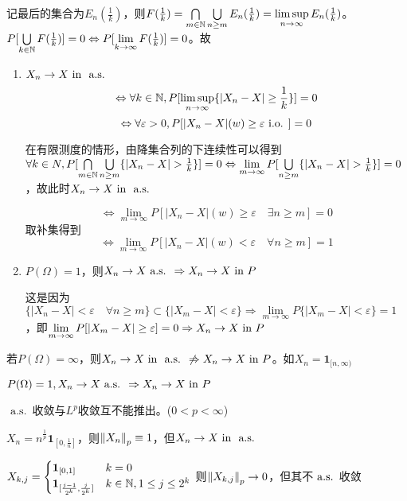 \documentclass{ctexbook}
\begin{document}
记最后的集合为$E_{n}(\frac 1 k)$，则$F(\frac 1 k)=\bigcap\limits_{m\in\mathbb{N}}\bigcup\limits_{n\geq m}E_{n}(\frac 1 k)=\limsup\limits_{n\to\infty}E_{n}(\frac 1 k)$。$P[\bigcup\limits_{k\in\mathbb{N}}F(\frac 1 k)]=0\Leftrightarrow P[\lim\limits_{k\to\infty}F(\frac 1 k)]=0$。故

\begin{Prop}
  \begin{enumerate}
  \item $X_{n}\to X\text{ in } \text{ a.s. }$
    \[\Leftrightarrow \forall k\in\mathbb{N}, P[\limsup\limits_{n\to\infty}\{|X_{n}-X|\geq\frac{1}{k}\}]=0\]
    \[\Leftrightarrow \forall\varepsilon>0, P[|X_{n}-X|(w)\geq\varepsilon \text{ i.o. }]=0\]

    在有限测度的情形，由降集合列的下连续性可以得到$\forall k\in N, P[\bigcap\limits_{m\in\N}\bigcup\limits_{n\geq m}\{|X_{n}-X|>\frac 1 k\}]=0\Leftrightarrow \lim\limits_{m\to\infty}P[\bigcup\limits_{n\geq m}\{|X_{n}-X|>\frac 1 k\}]=0$，故此时$X_{n}\to X\text{ in }\text{ a.s. }$

\[\Leftrightarrow \lim_{m\to\infty}P[|X_{n}-X|(w)\geq \varepsilon\quad \exists n\geq m]=0\]
取补集得到
\[\Leftrightarrow \lim_{m\to\infty}P[|X_{n}-X|(w)<\varepsilon\quad\forall n\geq m]=1\]

\item $P(\Omega)=1$，则$X_{n}\to X\text{ a.s. }\Rightarrow X_{n}\to X\text{ in } P$

  这是因为$\{|X_{n}-X|<\varepsilon\quad\forall n\geq m\}\subset \{|X_{m}-X|<\varepsilon\}\Rightarrow \lim\limits_{m\to\infty}P\{|X_{m}-X|<\varepsilon\}=1$，即$\lim\limits_{m\to\infty}P[|X_{m}-X|\geq \varepsilon]=0\Rightarrow X_{n}\to X\text{ in } P$
  \end{enumerate}
\end{Prop}  
  \begin{Rmk}
    若$P(\Omega)=\infty$，则$X_{n}\to X\text{ in } \text{ a.s. }\not\Rightarrow X_{n}\to X\text{ in } P$。如$X_{n}=\bm 1_{[n,\infty)}$
  \end{Rmk}

  \begin{Rmk}
    $P(\Omega)=1, X_{n}\to X\text{ a.s. }\Rightarrow X_{n}\to X\text{ in } P$
  \end{Rmk}

  \begin{Eg}
    $\text{ a.s. }$收敛与$L^{p}$收敛互不能推出。($0<p<\infty$)

    $X_{n}=n^{\frac 1 p}\bm 1_{[0,\frac 1 n]}$，则$\left\|X_{n}\right\|_{p}\equiv 1$，但$X_{n}\to X\text{ in }\text{ a.s. }$

    $X_{k,j}=
    \begin{cases}
      \bm 1_{[0,1]}& k=0\\ \bm{1}_{[\frac{j-1}{2^{k}},\frac{j}{2^{k}}]} &k\in\mathbb{N}, 1\leq j\leq 2^{k}
    \end{cases}
    $
    则$\left\|X_{k,j}\right\|_{p}\to 0$，但其不$\text{ a.s. }$收敛
  \end{Eg}
\end{document}

